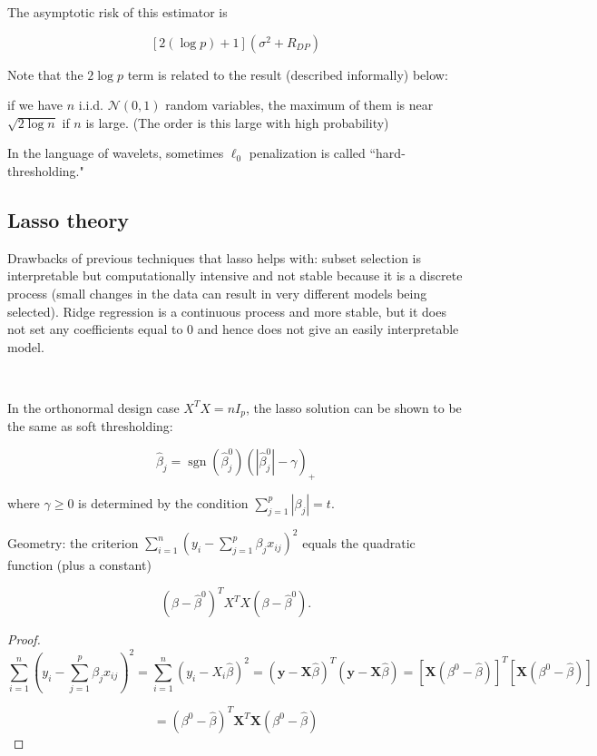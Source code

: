 The asymptotic risk of this estimator is 

\[
[2(\log p) + 1](\sigma^2 + R_{DP})
\]

Note that the \(2 \log p\) term is related to the result (described informally) below:

\begin{proposition}
if we have \(n\) i.i.d. \(\mathcal{N}(0,1)\) random variables, the maximum of them is near \(\sqrt{2 \log n}\) if \(n\) is large. (The order is this large with high probability)
\end{proposition}

\begin{remark} In the language of wavelets, sometimes \(\ell_0\) penalization is called ``hard-thresholding."

\end{remark}

\subsection{Lasso theory}

Drawbacks of previous techniques that lasso helps with: subset selection is interpretable but computationally intensive and not stable because it is a discrete process (small changes in the data can result in very different models being selected). Ridge regression is a continuous process and more stable, but it does not set any coefficients equal to 0 and hence does not give an easily interpretable model.

\

In the orthonormal design case \(X^T X = n I_p\), the lasso solution can be shown to be the same as soft thresholding:

\[
\hat{\beta}_j = \operatorname{sgn}(\hat{\beta}_j^0) (| \hat{\beta}_j^0| - \gamma)_+
\]

where \(\gamma \geq 0\) is determined by the condition \(\sum_{j=1}^p |\beta_j| = t\).

Geometry: the criterion \(\sum_{i=1}^n (y_i - \sum_{j=1}^p \beta_j x_{ij})^2\) equals the quadratic function (plus a constant)

\[
(\beta - \hat{\beta}^0)^TX^T X(\beta - \hat{\beta}^0).
\]

\begin{proof}

\[
\sum_{i=1}^n \left(y_i - \sum_{j=1}^p \beta_j x_{ij} \right)^2 = \sum_{i=1}^n \left(y_i - X_i \hat{\beta}\right)^2 = (\boldsymbol{y} - \boldsymbol{X}\hat{\beta})^T (\boldsymbol{y} - \boldsymbol{X}\hat{\beta}) = [ \boldsymbol{X}(\beta^0 -\hat{\beta})]^T [ \boldsymbol{X}(\beta^0 -\hat{\beta})]
\]

\[
 = (\beta^0 -\hat{\beta})^T \boldsymbol{X}^T  \boldsymbol{X}(\beta^0 -\hat{\beta})
\]

\end{proof}

